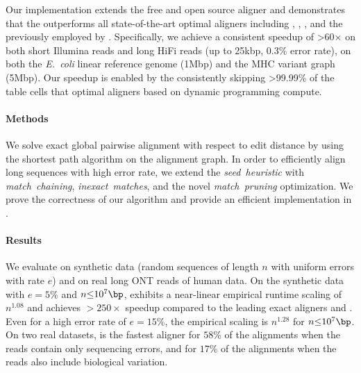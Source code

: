 Our implementation extends the free and open source aligner and demonstrates
that the \seedh outperforms all state-of-the-art optimal aligners including
\graphaligner, \vargas, \pasgal, and the \prefixh previously employed by
\astarix. Specifically, we achieve a consistent speedup of >60$\times$ on both
short Illumina reads and long HiFi reads (up to 25kbp, 0.3\% error rate), on
both the \textit{E.~coli} linear reference genome (1Mbp) and the MHC variant
graph (5Mbp). Our speedup is enabled by the \seedh consistently skipping
>99.99\% of the table cells that optimal aligners based on dynamic programming
compute.

\paragraph{Methods}
We solve exact global pairwise alignment with respect to edit distance by using
the \A shortest path algorithm on the alignment graph. In order to efficiently
align long sequences with high error rate, we extend the \emph{seed~heuristic}
with \emph{match~chaining}, \emph{inexact~matches}, and the novel
\emph{match~pruning} optimization. We prove the correctness of our algorithm and
provide an efficient implementation in \astarpa.
\paragraph{Results}
We evaluate \astarpa on synthetic data (random sequences of length $n$ with
uniform errors with rate $e$) and on real long ONT reads of human data. On the
synthetic data with $e{=}5\%$ and $n{\leq}10^7\bp$, \astarpa exhibits a
near-linear empirical runtime scaling of $n^{1.08}$ and achieves ${>}250\times$
speedup compared to the leading exact aligners \edlib and \wfa. Even for a high
error rate of $e{=}15\%$, the empirical scaling is $n^{1.28}$ for
$n{\leq}10^7\bp$. On two real datasets, \astarpa is the fastest aligner for
$58\%$ of the alignments when the reads contain only sequencing errors, and for
$17\%$ of the alignments when the reads also include biological variation.